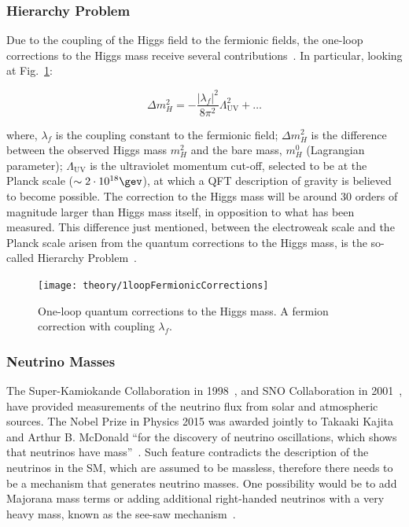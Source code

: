		\subsubsection*{Hierarchy Problem}

			Due to the coupling of the Higgs field to the fermionic fields, the one-loop corrections to the Higgs mass receive several contributions~\cite{Weinberg1976}. In particular, looking at Fig.~\ref{fig:higgs_f_coupling}: 

			\begin{equation}
				\label{eq:mH_fermionic_contribution}
				\Delta m_H^2 = - \frac{ | \lambda_f  |^2}{8 \pi ^2} \Lambda_{\mathrm{UV}}^2 + \dots 
			\end{equation}
 	
			\noindent where, $\lambda_f$ is the coupling constant to the fermionic field; $\Delta m_H^2$ is the difference between the observed Higgs mass $m_H^2$ and the bare mass, $m_H^0$ (Lagrangian parameter); $\Lambda_{\mathrm{UV}}$ is the ultraviolet momentum cut-off, selected to be at the Planck scale ($\sim 2 \cdot 10^{18} \gev$), at which a \ac{QFT} description of gravity is believed to become possible. The correction to the Higgs mass will be around 30 orders of magnitude larger than Higgs mass itself, in opposition to what has been measured. This difference just mentioned, between the electroweak scale and the Planck scale arisen from the quantum corrections to the Higgs mass, is the so-called Hierarchy Problem~\cite{Weinberg1976}.

			\begin{figure}
				\centering
				\texttt{[image: theory/1loopFermionicCorrections]}
				\caption{\label{fig:higgs_f_coupling} One-loop quantum corrections to the Higgs mass. A fermion correction with coupling $\lambda_f$.}
			\end{figure}



		\subsubsection*{Neutrino Masses}

			The Super-Kamiokande Collaboration in 1998~\cite{SK1998}, and SNO Collaboration in 2001~\cite{SNO2001}, have provided measurements of the neutrino flux from solar and atmospheric sources. 
			The Nobel Prize in Physics 2015 was awarded jointly to Takaaki Kajita and Arthur B. McDonald ``for the discovery of neutrino oscillations, which shows that neutrinos have mass''~\cite{Nobel2015}. Such feature contradicts the description of the neutrinos in the \ac{SM}, which are assumed to be massless, therefore there needs to be a mechanism that generates neutrino masses. One possibility would be to add Majorana mass terms or adding additional right-handed neutrinos with a very heavy mass, known as the see-saw mechanism~\cite{Akhmedov1999}.


